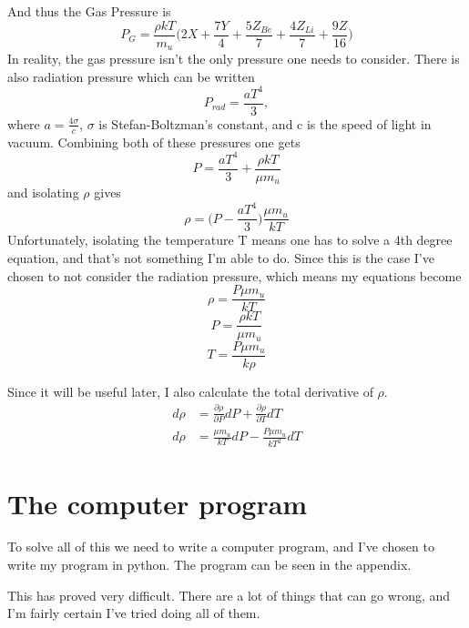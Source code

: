 \documentclass[a4paper,12pt]{article}
\begin{document}
And thus the Gas Pressure is
\begin{equation}
 P_G = \frac{\rho kT}{m_u}\bigg(2X + \frac{7Y}{4}+\frac{5Z_{Be}}{7} + \frac{4Z_{Li}}{7}+\frac{9Z}{16}\bigg)
\end{equation}
In reality, the gas pressure isn't the only pressure one needs to consider. There is also radiation pressure which can be written
$$P_{rad} = \frac{aT^4}{3},$$
where $a = \frac{4\sigma}{c}$, $\sigma$ is Stefan-Boltzman's constant, and c is the speed of light in vacuum.
Combining both of these pressures one gets
\begin{equation}
 P = \frac{aT^4}{3} + \frac{\rho kT}{\mu m_u}
\end{equation}
and isolating $\rho$ gives
\begin{equation}
 \rho = \bigg( P-\frac{aT^4}{3} \bigg) \frac{\mu m_u}{kT}
\end{equation}
Unfortunately, isolating the temperature T means one has to solve a 4th degree equation, and that's not something I'm able to do. 
Since this is the case I've chosen to not consider the radiation pressure, which means my equations become
\begin{equation}
 \rho = \frac{P\mu m_u}{kT}
\end{equation}
\begin{equation}
 P = \frac{\rho kT}{\mu m_u}
\end{equation}
\begin{equation}
 T = \frac{P\mu m_u}{k\rho}
\end{equation}

Since it will be useful later, I also calculate the total derivative of $\rho$.
\begin{equation}
\begin{aligned}
d\rho &= \frac{\partial\rho}{\partial P}dP + \frac{\partial\rho}{\partial T}dT\\
d\rho &= \frac{\mu m_u}{kT}dP - \frac{P\mu m_u}{kT^2}dT
\end{aligned}
\end{equation}


\section{The computer program}
To solve all of this we need to write a computer program, and I've chosen to write my program in python. The program can be seen in the appendix.

This has proved very difficult. 
There are a lot of things that can go wrong, and I'm fairly certain I've tried doing all of them. 
\end{document}
